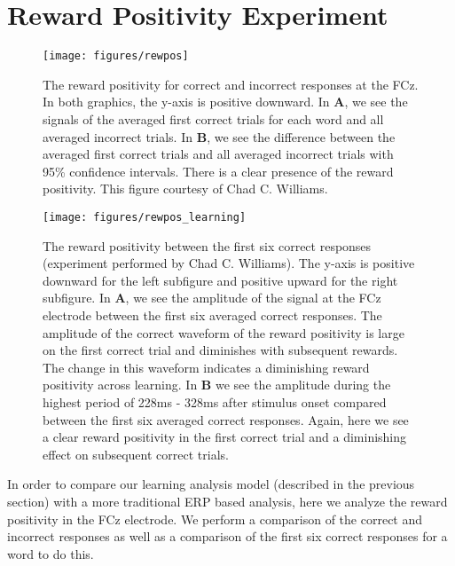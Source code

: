 \section{Reward Positivity Experiment}

\begin{figure}[t]
  \centerline{
    \texttt{[image: figures/rewpos]}
  }
  \caption[Reward Positivity for Correct and Incorrect Responses]{
    The reward positivity for correct and incorrect responses at the FCz. In 
    both graphics, the y-axis is positive downward. In {\bf A}, we see the 
    signals of the averaged first correct trials for each word and all averaged 
    incorrect trials. In {\bf B}, we see the difference between the averaged 
    first correct trials and all averaged incorrect trials with 95\% confidence 
    intervals. There is a clear presence of the reward positivity. This figure 
    courtesy of Chad C. Williams.
  }
  \label{fig:rewpos}
\end{figure}

\begin{figure}[t]
  \centerline{
    \texttt{[image: figures/rewpos\_learning]}
  }
  \caption[Reward Positivity between the First Six Correct Responses]{
    The reward positivity between the first six correct responses (experiment 
    performed by Chad C. Williams). The y-axis is positive downward for the 
    left subfigure and positive upward for the right subfigure. In {\bf A}, we 
    see the amplitude of the signal at the FCz electrode between the first six 
    averaged correct responses. The amplitude of the correct waveform of the 
    reward positivity is large on the first correct trial and diminishes with 
    subsequent rewards.  The change in this waveform indicates a diminishing 
    reward positivity across learning. In {\bf B} we see the amplitude during 
    the highest period of 228ms - 328ms after stimulus onset compared between 
    the first six averaged correct responses.  Again, here we see a clear 
    reward positivity in the first correct trial and a diminishing effect on 
    subsequent correct trials.
  }
  \label{fig:rewpos_learning}
\end{figure}

In order to compare our learning analysis model (described in the previous 
section) with a more traditional ERP based analysis, here we analyze the reward 
positivity in the FCz electrode. We perform a comparison of the correct and 
incorrect responses as well as a comparison of the first six correct responses 
for a word to do this.

